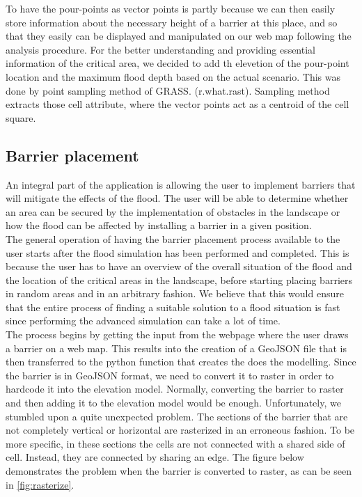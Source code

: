 To have the pour-points as vector points is partly because we can then easily store information about the necessary height of a barrier at this place, and so that they easily can be displayed and manipulated on our web map following the analysis procedure. 
For the better understanding and providing essential information of the critical area, we decided to add th elevetion of the pour-point location and the maximum flood depth based on the actual scenario. This was done by point sampling method of GRASS. (r.what.rast). Sampling method extracts those cell attribute, where the vector points act as a centroid of the cell square. \\

\subsection{Barrier placement}
An integral part of the application is allowing the user to implement barriers that will mitigate the effects of the flood. The user will be able to determine whether an area can be secured by the implementation of obstacles in the landscape or how the flood can be affected by installing a barrier in a given position. \\
The general operation of having the barrier placement process available to the user starts after the flood simulation has been performed and completed. This is because the user has to have an overview of the overall situation of the flood and the location of the critical areas in the landscape, before starting placing barriers in random areas and in an arbitrary fashion. We believe that this would ensure that the entire process of finding a suitable solution to a flood situation is fast since performing the advanced simulation can take a lot of time.\\

The process begins by getting the input from the webpage where the user draws a barrier on a web map. This results into the creation of a GeoJSON file that is then transferred to the python function that creates the does the modelling. Since the barrier is in GeoJSON format, we need to convert it to raster in order to hardcode it into the elevation model. Normally, converting the barrier to raster and then adding it to the elevation model would be enough. Unfortunately, we stumbled upon a quite unexpected problem. The sections of the barrier that are not completely vertical or horizontal are rasterized in an erroneous fashion. To be more specific, in these sections the cells are not connected with a shared side of cell. Instead, they are connected by sharing an edge. The figure below demonstrates the problem when the barrier is converted to raster, as can be seen in \autoref{fig:rasterize}.\\

